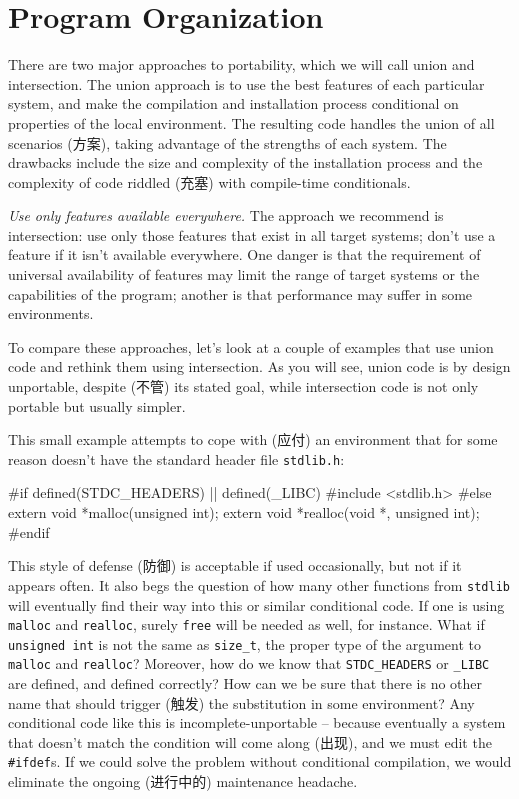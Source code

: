 \section{Program Organization}
\label{sec:program_organization}

There are two major approaches to portability, which we will call union and
intersection. The union approach is to use the best features of each
particular system, and make the compilation and installation process
conditional on properties of the local environment. The resulting code
handles the union of all scenarios (方案), taking advantage of the
strengths of each system. The drawbacks include the size and complexity of
the installation process and the complexity of code riddled (充塞) with
compile-time conditionals.

\emph{Use only features available everywhere.} The approach we recommend is
intersection: use only those features that exist in all target systems;
don't use a feature if it isn't available everywhere. One danger is that
the requirement of universal availability of features may limit the range
of target systems or the capabilities of the program; another is that
performance may suffer in some environments.

To compare these approaches, let's look at a couple of examples that use
union code and rethink them using intersection. As you will see, union code
is by design unportable, despite (不管) its stated goal, while intersection
code is not only portable but usually simpler.

This small example attempts to cope with (应付) an environment that for
some reason doesn't have the standard header file \verb'stdlib.h':

\begin{wellcode}
    #if defined(STDC_HEADERS) || defined(_LIBC)
        #include <stdlib.h>
    #else
        extern void *malloc(unsigned int);
        extern void *realloc(void *, unsigned int);
    #endif
\end{wellcode}
This style of defense (防御) is acceptable if used occasionally, but not if
it appears often. It also begs the question of how many other functions
from \verb'stdlib' will eventually find their way into this or similar
conditional code. If one is using \verb'malloc' and \verb'realloc', surely
\verb'free' will be needed as well, for instance. What if
\verb'unsigned int' is not the same as \verb'size_t', the proper type of
the argument to
\verb'malloc' and \verb'realloc'? Moreover, how do we know that
\verb'STDC_HEADERS' or \verb'_LIBC' are defined, and defined correctly?
How can we be sure that there is no other name that should trigger (触发)
the substitution in some environment? Any conditional code like this is
incomplete-unportable -- because eventually a system that doesn't match the
condition will come along (出现), and we must edit the \verb'#ifdef's. If
we could solve the problem without conditional compilation, we would
eliminate the ongoing (进行中的) maintenance headache.

